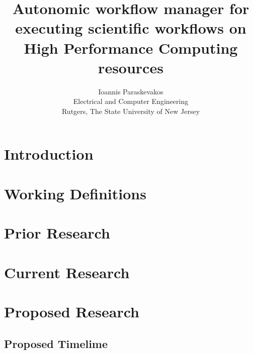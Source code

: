 

\title{Autonomic workflow manager for executing scientific workflows on High Performance Computing resources}
\author{Ioannis Paraskevakos \\	Electrical and Computer Engineering \\
        Rutgers, The State University of New Jersey}


\maketitle


\section{Introduction}


\section{Working Definitions}


\section{Prior Research}


\section{Current Research}


\section{Proposed Research}


\subsection{Proposed Timelime}




